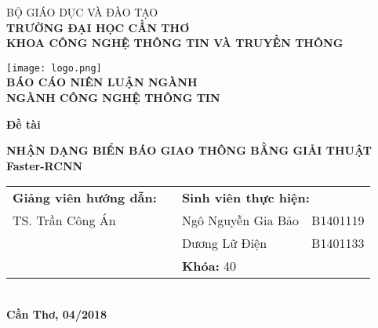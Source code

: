 \documentclass[../thesis.tex]{subfiles}
\begin{document}
\begin{titlepage}

\begin{center}

BỘ GIÁO DỤC VÀ ĐÀO TẠO\\
\textbf{TRƯỜNG ĐẠI HỌC CẦN THƠ\\}
\textbf{KHOA CÔNG NGHỆ THÔNG TIN VÀ TRUYỀN THÔNG\\[1cm]}

\texttt{[image: logo.png]}\\[1cm]

\textbf{BÁO CÁO NIÊN LUẬN NGÀNH\\}
\textbf{NGÀNH CÔNG NGHỆ THÔNG TIN\\[2cm]}

\begin{large}
\textbf{Đề tài\\[0.5cm]}
\end{large}
\textbf{{\LARGE NHẬN DẠNG BIỂN BÁO GIAO THÔNG BẰNG GIẢI THUẬT Faster-RCNN}}
\\[3.5cm]

\begin{tabular}{ l c l l }
	 \textbf{Giảng viên hướng dẫn:} & & \multicolumn{2}{l}{\textbf{Sinh viên thực hiện:}}\\
	 TS. Trần Công Án & & Ngô Nguyễn Gia Bảo &
	 B1401119\\
	 & & Dương Lữ Điện & B1401133\\
	 & & \multicolumn{2}{l}{\textbf{Khóa:} 40}
\end{tabular}
\\[4cm]

\textbf{Cần Thơ, 04/2018}

\end{center}

\end{titlepage}
\end{document}
